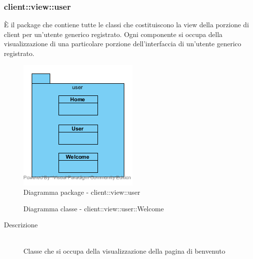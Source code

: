 \vspace{0.5cm}
\subsubsection{client::view::user}
È il package che contiene tutte le classi che costituiscono la view della porzione di client per un'utente generico registrato. Ogni componente si occupa della visualizzazione di una particolare porzione dell'interfaccia di un'utente generico registrato.\begin{center}
	\begin{figure}[H]
		\centering \includegraphics[scale=4, max width=\textwidth, max height=\myheight]{../img/diagrammiClassi/client/view/user.png}
		\caption{Diagramma package - client::view::user}
	\end{figure}
\end{center}\hypertarget{client::view::user::Welcome}{}
\begin{figure}[H]
	\centering
	\caption{Diagramma classe - client::view::user::Welcome}
\end{figure}\begin{description}
\item[Descrizione] \hfill \\
Classe che si occupa della visualizzazione della pagina di benvenuto
\end{description}

